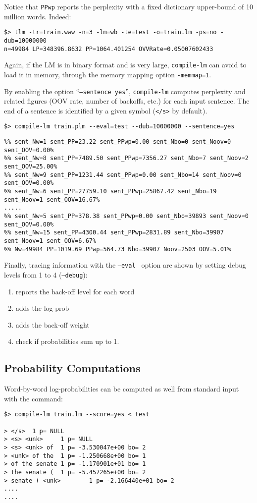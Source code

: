 \noindent
Notice that {\tt PPwp} reports the perplexity with a fixed dictionary upper-bound of 10 million words. Indeed:
\begin{verbatim}
$> tlm -tr=train.www -n=3 -lm=wb -te=test -o=train.lm -ps=no -dub=10000000 
n=49984 LP=348396.8632 PP=1064.401254 OVVRate=0.05007602433
\end{verbatim}

\bigskip
\noindent
Again, if the LM is in binary format and is very large, {\tt compile-lm} can avoid to load it in memory,
through the memory mapping option {\tt -memmap=1}.

\bigskip
\noindent
By enabling the option ``{\tt --sentence yes}'', {\tt compile-lm} computes perplexity and related figures (OOV rate, number of backoffs, etc.) for each input sentence. The end of a sentence is identified by a given symbol ({\tt </s>} by default).
\begin{verbatim}
$> compile-lm train.plm --eval=test --dub=10000000 --sentence=yes	
\end{verbatim}
{\small 
\begin{verbatim}
%% sent_Nw=1 sent_PP=23.22 sent_PPwp=0.00 sent_Nbo=0 sent_Noov=0 sent_OOV=0.00%
%% sent_Nw=8 sent_PP=7489.50 sent_PPwp=7356.27 sent_Nbo=7 sent_Noov=2 sent_OOV=25.00%
%% sent_Nw=9 sent_PP=1231.44 sent_PPwp=0.00 sent_Nbo=14 sent_Noov=0 sent_OOV=0.00%
%% sent_Nw=6 sent_PP=27759.10 sent_PPwp=25867.42 sent_Nbo=19 sent_Noov=1 sent_OOV=16.67%
.....
%% sent_Nw=5 sent_PP=378.38 sent_PPwp=0.00 sent_Nbo=39893 sent_Noov=0 sent_OOV=0.00%
%% sent_Nw=15 sent_PP=4300.44 sent_PPwp=2831.89 sent_Nbo=39907 sent_Noov=1 sent_OOV=6.67%
%% Nw=49984 PP=1019.69 PPwp=564.73 Nbo=39907 Noov=2503 OOV=5.01%
\end{verbatim}
}

\bigskip
\noindent
Finally, tracing information with the {\tt --eval }  option are shown by setting 
debug levels from 1 to 4 ({\tt --debug}):
\begin{enumerate}
\item reports the back-off level for each word
\item adds the log-prob 
\item adds the back-off weight
\item check if probabilities sum up to 1.
\end{enumerate}


\subsection{Probability Computations}
Word-by-word log-probabilities  can be computed as well from standard input with the command:
\begin{verbatim}
$> compile-lm train.lm --score=yes < test

> </s>  1 p= NULL
> <s> <unk>     1 p= NULL
> <s> <unk> of  1 p= -3.530047e+00 bo= 2
> <unk> of the  1 p= -1.250668e+00 bo= 1
> of the senate 1 p= -1.170901e+01 bo= 1
> the senate (  1 p= -5.457265e+00 bo= 2
> senate ( <unk>        1 p= -2.166440e+01 bo= 2
....
....
\end{verbatim}

